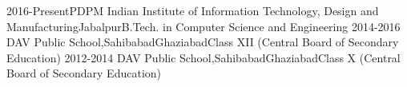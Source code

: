 

\begin{educations}
    \education
    {2016-Present}{PDPM Indian Institute of Information Technology, Design and Manufacturing}{Jabalpur}{B.Tech. in Computer Science and Engineering\hfill \color{accentcolor}{CPI - 8.1/10}}
    \emptySeparator
    \education
    {2014-2016} {DAV Public School,Sahibabad}{Ghaziabad}{Class XII (Central Board of Secondary Education)\hfill \color{accentcolor}{Percentage - 94.6/100}}
    \emptySeparator
    \education
    {2012-2014} {DAV Public School,Sahibabad}{Ghaziabad}{Class X (Central Board of Secondary Education)\hfill \color{accentcolor}{CGPA - 10/10}}
    \emptySeparator
\end{educations}
